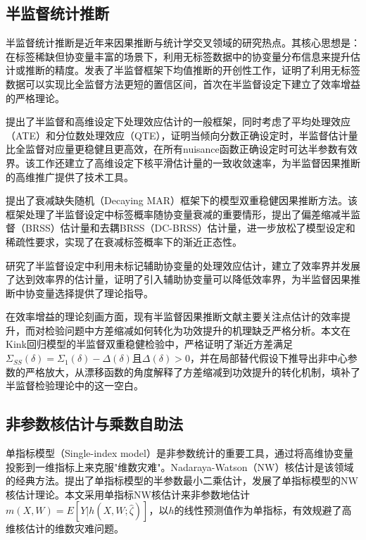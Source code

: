 \documentclass[12pt,a4paper]{ctexart}
\renewcommand*{\cite}{\supercite}
\begin{document}
\subsection{半监督统计推断}

半监督统计推断是近年来因果推断与统计学交叉领域的研究热点。其核心思想是：在标签稀缺但协变量丰富的场景下，利用无标签数据中的协变量分布信息来提升估计或推断的精度。\cite{zhang2022}发表了半监督框架下均值推断的开创性工作，证明了利用无标签数据可以实现比全监督方法更短的置信区间，首次在半监督设定下建立了效率增益的严格理论。

\cite{chakrabortty2024}提出了半监督和高维设定下处理效应估计的一般框架，同时考虑了平均处理效应（ATE）和分位数处理效应（QTE），证明当倾向分数正确设定时，半监督估计量比全监督对应量更稳健且更高效，在所有nuisance函数正确设定时可达半参数有效界。该工作还建立了高维设定下核平滑估计量的一致收敛速率，为半监督因果推断的高维推广提供了技术工具。

\cite{zhang2023}提出了衰减缺失随机（Decaying MAR）框架下的模型双重稳健因果推断方法。该框架处理了半监督设定中标签概率随协变量衰减的重要情形，提出了偏差缩减半监督（BRSS）估计量和去耦BRSS（DC-BRSS）估计量，进一步放松了模型设定和稀疏性要求，实现了在衰减标签概率下的渐近正态性。

\cite{kato2025}研究了半监督设定中利用未标记辅助协变量的处理效应估计，建立了效率界并发展了达到效率界的估计量，证明了引入辅助协变量可以降低效率界，为半监督因果推断中协变量选择提供了理论指导。

在效率增益的理论刻画方面，现有半监督因果推断文献主要关注点估计的效率提升，而对检验问题中方差缩减如何转化为功效提升的机理缺乏严格分析。本文在Kink回归模型的半监督双重稳健检验中，严格证明了渐近方差满足$\Sigma_{SS}(\delta) = \Sigma_1(\delta) - \Delta(\delta)$且$\Delta(\delta) > 0$，并在局部替代假设下推导出非中心参数的严格放大，从漂移函数的角度解释了方差缩减到功效提升的转化机制，填补了半监督检验理论中的这一空白。

\subsection{非参数核估计与乘数自助法}

单指标模型（Single-index model）是非参数统计的重要工具，通过将高维协变量投影到一维指标上来克服"维数灾难"。Nadaraya-Watson（NW）核估计是该领域的经典方法。\cite{ichimura1993}提出了单指标模型的半参数最小二乘估计，\cite{hardle1993}发展了单指标模型的NW核估计理论。本文采用单指标NW核估计来非参数地估计$m(X,W) = E[Y|h(X,W;\hat{\zeta})]$，以$h$的线性预测值作为单指标，有效规避了高维核估计的维数灾难问题。
\end{document}
